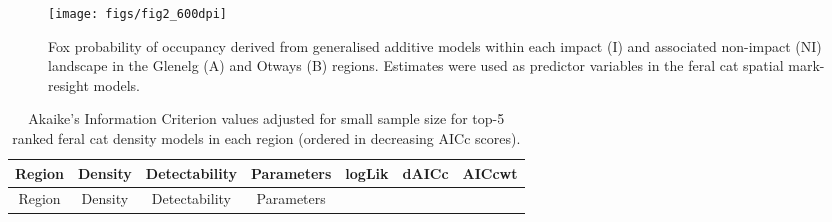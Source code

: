 \documentclass[]{elsarticle} %
\begin{document}
\begin{figure}
\texttt{[image: figs/fig2\_600dpi]} \caption{Fox probability of occupancy derived from generalised additive models within each impact (I) and associated non-impact (NI) landscape in the Glenelg (A) and Otways (B) regions. Estimates were used as predictor variables in the feral cat spatial mark-resight models.}\label{fig:foxplot}
\end{figure}

\newpage

\begin{longtable}[]{@{}ccccccc@{}}
\caption{\label{tab:aictab} Akaike's Information Criterion values adjusted for small sample size for top-5 ranked feral cat density models in each region (ordered in decreasing AICc scores).}\tabularnewline
\toprule
\begin{minipage}[b]{0.09\columnwidth}\centering
Region\strut
\end{minipage} & \begin{minipage}[b]{0.20\columnwidth}\centering
Density\strut
\end{minipage} & \begin{minipage}[b]{0.15\columnwidth}\centering
Detectability\strut
\end{minipage} & \begin{minipage}[b]{0.12\columnwidth}\centering
Parameters\strut
\end{minipage} & \begin{minipage}[b]{0.08\columnwidth}\centering
logLik\strut
\end{minipage} & \begin{minipage}[b]{0.07\columnwidth}\centering
dAICc\strut
\end{minipage} & \begin{minipage}[b]{0.08\columnwidth}\centering
AICcwt\strut
\end{minipage}\tabularnewline
\midrule
\endfirsthead
\toprule
\begin{minipage}[b]{0.09\columnwidth}\centering
Region\strut
\end{minipage} & \begin{minipage}[b]{0.20\columnwidth}\centering
Density\strut
\end{minipage} & \begin{minipage}[b]{0.15\columnwidth}\centering
Detectability\strut
\end{minipage} & \begin{minipage}[b]{0.12\columnwidth}\centering
Parameters\strut
\end{minipage} & \begin{minipage}[b]{0.08\columnwidth}\centering

\end{minipage}
\end{longtable}
\end{document}
